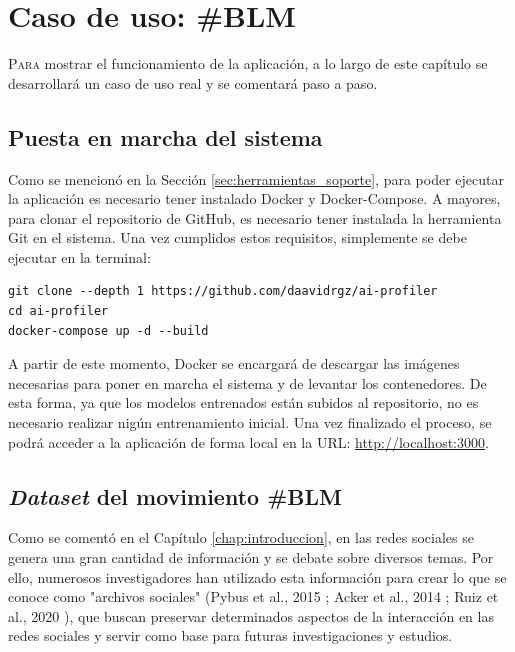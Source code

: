 \chapter{Caso de uso: \#BLM}
\label{chap:casouso}

\lettrine{P}{ara} mostrar el funcionamiento de la aplicación, a lo largo de este capítulo se desarrollará un caso de uso real y se comentará paso a paso.

\section{Puesta en marcha del sistema}
\label{sec:casouso_puesta_en_marcha}

Como se mencionó en la Sección \ref{sec:herramientas_soporte}, para poder ejecutar la aplicación es necesario tener
instalado Docker y Docker-Compose. A mayores, para clonar el repositorio de GitHub, es necesario tener instalada la
herramienta Git en el sistema. Una vez cumplidos estos requisitos, simplemente se debe ejecutar en la terminal:

\bigskip
\begin{Verbatim}
git clone --depth 1 https://github.com/daavidrgz/ai-profiler
cd ai-profiler
docker-compose up -d --build
\end{Verbatim}

\bigskip
A partir de este momento, Docker se encargará de descargar las imágenes necesarias para poner en marcha el sistema y de levantar los
contenedores. De esta forma, ya que los modelos entrenados están subidos al repositorio, no es necesario realizar
nigún entrenamiento inicial. Una vez finalizado el proceso, se podrá acceder a la aplicación de forma local en la URL: \url{http://localhost:3000}.

\section{\textit{Dataset} del movimiento \#BLM}
\label{sec:casouso_dataset}

Como se comentó en el Capítulo \ref{chap:introduccion}, en las redes sociales se genera una gran cantidad de información y se debate sobre
diversos temas. Por ello, numerosos investigadores han utilizado esta información para crear lo que se conoce como "archivos sociales"
(Pybus et al., 2015 \cite{pybus2015hacking}; Acker et al., 2014 \cite{acker2014death}; Ruiz et al., 2020 \cite{ruiz2020cuentalo}),
que buscan preservar determinados aspectos de la interacción en las redes sociales y servir como base para futuras investigaciones
y estudios.

